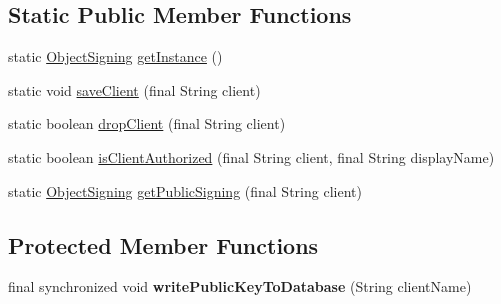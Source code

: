 \subsection*{Static Public Member Functions}
\begin{DoxyCompactItemize}
\item 
static \hyperlink{classgov_1_1fnal_1_1ppd_1_1dd_1_1util_1_1specific_1_1ObjectSigning}{Object\-Signing} \hyperlink{classgov_1_1fnal_1_1ppd_1_1dd_1_1util_1_1specific_1_1ObjectSigning_a905548cd8a28135026ff8cd2e3f09598}{get\-Instance} ()
\item 
static void \hyperlink{classgov_1_1fnal_1_1ppd_1_1dd_1_1util_1_1specific_1_1ObjectSigning_a2c6282d1254482c733c5bdb01ae4fd2b}{save\-Client} (final String client)
\item 
static boolean \hyperlink{classgov_1_1fnal_1_1ppd_1_1dd_1_1util_1_1specific_1_1ObjectSigning_ab51a44acbc4795b78f9b608c361e9369}{drop\-Client} (final String client)
\item 
static boolean \hyperlink{classgov_1_1fnal_1_1ppd_1_1dd_1_1util_1_1specific_1_1ObjectSigning_a462a209a028c4c3f44ab861d0a56ab8f}{is\-Client\-Authorized} (final String client, final String display\-Name)
\item 
static \hyperlink{classgov_1_1fnal_1_1ppd_1_1dd_1_1util_1_1specific_1_1ObjectSigning}{Object\-Signing} \hyperlink{classgov_1_1fnal_1_1ppd_1_1dd_1_1util_1_1specific_1_1ObjectSigning_a48a7965d0e3f9d1c827589b816ca3b45}{get\-Public\-Signing} (final String client)
\end{DoxyCompactItemize}
\subsection*{Protected Member Functions}
\begin{DoxyCompactItemize}
\item 
\hypertarget{classgov_1_1fnal_1_1ppd_1_1dd_1_1util_1_1specific_1_1ObjectSigning_a07b9c0efe4e036f0902c8d4a18e05693}{final synchronized void {\bfseries write\-Public\-Key\-To\-Database} (String client\-Name)}\label{classgov_1_1fnal_1_1ppd_1_1dd_1_1util_1_1specific_1_1ObjectSigning_a07b9c0efe4e036f0902c8d4a18e05693}

\end{DoxyCompactItemize}



